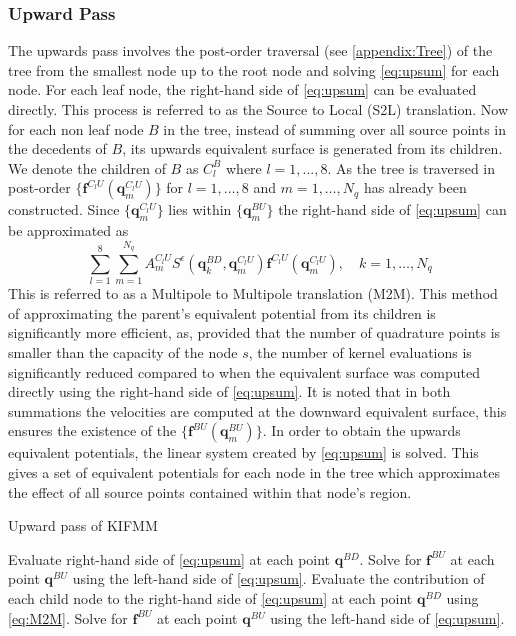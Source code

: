 \subsubsection{Upward Pass}
The upwards pass involves the post-order traversal (see \cref{appendix:Tree}) of the tree from the smallest node up to the root node and solving \cref{eq:upsum} for each node. For each leaf node, the right-hand side of \cref{eq:upsum} can be evaluated directly. This process is referred to as the Source to Local (S2L) translation.  Now for each non leaf node $B$ in the tree, instead of summing over all source points in the decedents of $B$, its upwards equivalent surface is generated from its children. We denote the children of $B$ as $C_l^B$ where $l=1,...,8$. As the tree is traversed in post-order $\{\bm{f}^{C_l U}(\bm{q}^{C_lU}_m)\}$ for $l=1,\dots,8$ and $m=1,\dots,N_q$ has already been constructed. Since $\{\bm{q}^{C_lU}_m\}$ lies within $\{\bm{q}^{BU}_m\}$ the right-hand side of \cref{eq:upsum} can be approximated as
\begin{equation}
\label{eq:M2M}
    \sum_{l=1}^{8} \sum_{m=1}^{N_{q}} A_{m}^{C_{l} U} S^\epsilon\left(\bm{q}_{k}^{B D}, \bm{q}_{m}^{C_{l} U}\right) \bm{f}^{C_{l} U}\left(\bm{q}_{m}^{C_{l} U}\right), \quad k=1,\dots,N_q
\end{equation}
This is referred to as a Multipole to Multipole translation (M2M). This method of approximating the parent's equivalent potential from its children is significantly more efficient, as, provided that the number of quadrature points is smaller than the capacity of the node $s$, the number of kernel evaluations is significantly reduced compared to when the equivalent surface was computed directly using the right-hand side of \cref{eq:upsum}. It is noted that in both summations the velocities are  computed at the downward equivalent surface, this ensures the existence of the $\{\bm{f}^{BU}(\bm{q}^{BU}_m)\}$. In order to obtain the upwards equivalent potentials, the linear system created by \cref{eq:upsum} is solved. This gives a set of equivalent potentials for each node in the tree which approximates the effect of all source points contained within that node's region.

\begin{algorithm}
\caption{Upward pass of KIFMM}\label{alg:UpKIFMM}
\begin{algorithmic}
\State Evaluate right-hand side of \cref{eq:upsum} at each point $\bm{q}^{BD}$.
\State Solve for $\bm{f}^{BU}$ at each point $\bm{q}^{BU}$ using the left-hand side of \cref{eq:upsum}.
\EndFor
{}
\State Evaluate the contribution of each child node to the right-hand side of \cref{eq:upsum} 
\State \quad at each point $\bm{q}^{BD}$ using \cref{eq:M2M}.
\State Solve for $\bm{f}^{BU}$ at each point $\bm{q}^{BU}$ using the left-hand side of \cref{eq:upsum}.
\EndFor
\end{algorithmic}
\end{algorithm}

